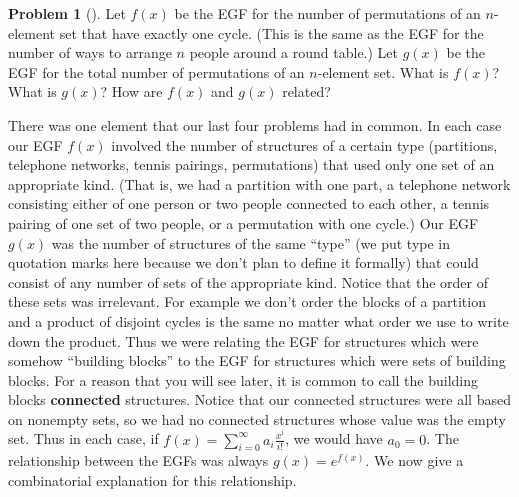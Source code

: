 \documentclass[10pt,]{book}
\newcommand{\terminology}[1]{\textbf{#1}}
\theoremstyle{plain}
\theoremstyle{definition}
\newtheorem{activity}[project]{Problem}
\theoremstyle{definition}
\numberwithin{equation}{chapter}
\begin{document}
\begin{activity}[] \label{exp_onecycle_}
\hypertarget{p-2170}{}%
Let \(f(x)\) be the EGF for the number of permutations of an \(n\)-element set that have exactly one cycle. (This is the same as the EGF for the number of ways to arrange \(n\) people around a round table.) Let \(g(x)\) be the EGF for the total number of permutations of an \(n\)-element set. What is \(f(x)\)? What is \(g(x)\)? How are \(f(x)\) and \(g(x)\) related?%
\end{activity}
\hypertarget{p-2172}{}%
There was one element that our last four problems had in common. In each case our EGF \(f(x)\) involved the number of structures of a certain type (partitions, telephone networks, tennis pairings, permutations) that used only one set of an appropriate kind. (That is, we had a partition with one part, a telephone network consisting either of one person or two people connected to each other, a tennis pairing of one set of two people, or a permutation with one cycle.) Our EGF \(g(x)\) was the number of structures of the same ``type'' (we put type in quotation marks here because we don't plan to define it formally) that could consist of any number of sets of the appropriate kind. Notice that the order of these sets was irrelevant. For example we don't order the blocks of a partition and a product of disjoint cycles is the same no matter what order we use to write down the product. Thus we were relating the EGF for structures which were somehow ``building blocks'' to the EGF for structures which were sets of building blocks. For a reason that you will see later, it is common to call the building blocks \terminology{connected} structures. Notice that our connected structures were all based on nonempty sets, so we had no connected structures whose value was the empty set. Thus in each case, if \(f(x) = \sum_{i=0}^\infty a_i\frac{x^i}{i!}\), we would have \(a_0=0\). The relationship between the EGFs was always \(g(x) = e^{f(x)}\). We now give a combinatorial explanation for this relationship.%
\end{document}
